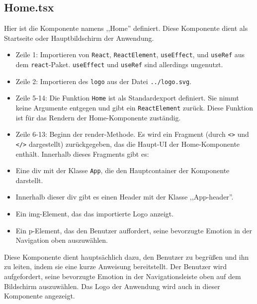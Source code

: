 \documentclass[./dokumentation.tex]{subfiles}
\begin{document}
\subsection{Home.tsx}
Hier ist die Komponente namens ,,Home'' definiert. Diese Komponente dient als Startseite oder Hauptbildschirm der Anwendung.\\

\begin{itemize}
    \item Zeile 1: Importieren von \verb+React+, \verb+ReactElement+, \verb+useEffect+, und \verb+useRef+ aus dem \verb+react+-Paket. \verb+useEffect+ und \verb+useRef+ sind allerdings ungenutzt. \\
    \item Zeile 2: Importieren des \verb+logo+ aus der Datei \verb+../logo.svg+. \\
    \item Zeile 5-14: Die Funktion \verb+Home+ ist als Standardexport definiert. Sie nimmt keine Argumente entgegen und gibt ein \verb+ReactElement+ zurück. Diese Funktion ist für das Rendern der Home-Komponente zuständig. \\
    \item Zeile 6-13: Beginn der render-Methode. Es wird ein Fragment (durch \verb+<>+ und \verb+</>+ dargestellt) zurückgegeben, das die Haupt-UI der Home-Komponente enthält. Innerhalb dieses Fragments gibt es: \\
    \item Eine div mit der Klasse \verb+App+, die den Hauptcontainer der Komponente darstellt. \\
    \item Innerhalb dieser div gibt es einen Header mit der Klasse ,,App-header''.  \\
    \item Ein img-Element, das das importierte Logo anzeigt. \\
    \item Ein p-Element, das den Benutzer auffordert, seine bevorzugte Emotion in der Navigation oben auszuwählen.\\
\end{itemize}

Diese Komponente dient hauptsächlich dazu, den Benutzer zu begrüßen und ihn zu leiten, indem sie eine kurze Anweisung bereitstellt. Der Benutzer wird aufgefordert, seine bevorzugte Emotion in der Navigationsleiste oben auf dem Bildschirm auszuwählen. Das Logo der Anwendung wird auch in dieser Komponente angezeigt.
\end{document}
